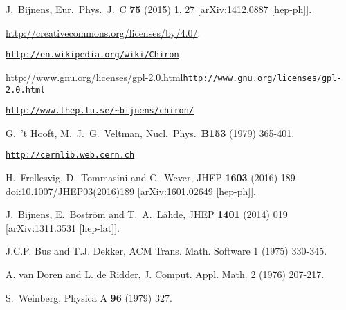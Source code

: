\documentclass[12pt,a4paper]{article}
\begin{document}
\begin{thebibliography}{99}
{}

 J.~Bijnens,
  Eur.\ Phys.\ J.\ C {\bf 75} (2015) 1,  27
  [arXiv:1412.0887 [hep-ph]].

 \url{http://creativecommons.org/licenses/by/4.0/}.


 \href{http://en.wikipedia.org/wiki/Chiron}{\tt http://en.wikipedia.org/wiki/Chiron}

 \url{http://www.gnu.org/licenses/gpl-2.0.html}{\tt http://www.gnu.org/licenses/gpl-2.0.html}

 \href{http://www.thep.lu.se/\%7Ebijnens/chiron/}{\tt http://www.thep.lu.se/\textasciitilde{}bijnens/chiron/}

  G.~'t Hooft, M.~J.~G.~Veltman,
  Nucl.\ Phys.\  {\bf B153 } (1979)  365-401.

 \href{http://cernlib.web.cern.ch}{\tt http://cernlib.web.cern.ch}

  H.~Frellesvig, D.~Tommasini and C.~Wever,
  JHEP {\bf 1603} (2016) 189
  doi:10.1007/JHEP03(2016)189
  [arXiv:1601.02649 [hep-ph]].


  J.~Bijnens, E.~Bostr\"om and T.~A.~L\"ahde,
  JHEP {\bf 1401} (2014) 019
  [arXiv:1311.3531 [hep-lat]].

J.C.P. Bus and T.J. Dekker,
ACM Trans. Math. Software 1 (1975) 330-345.

A. van Doren and L. de Ridder, 
J. Comput. Appl. Math. 2 (1976) 207-217. 

  S.~Weinberg,
  Physica A {\bf 96} (1979) 327.


\end{thebibliography}
\end{document}
